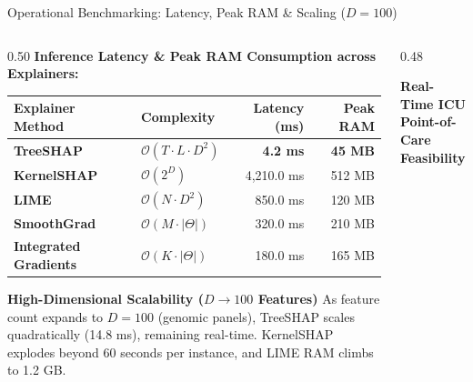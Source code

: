 \documentclass[aspectratio=169,10pt]{beamer}
\begin{document}
\begin{frame}{Operational Benchmarking: Latency, Peak RAM \& Scaling ($D=100$)}
  \vspace{-0.1cm}
  \begin{columns}[t]
    \begin{column}{0.50\textwidth}
      \textbf{\scriptsize Inference Latency \& Peak RAM Consumption across Explainers:}
      \vspace{0.03cm}
      \begin{table}[h]
        \centering
        \setlength{\tabcolsep}{2.5pt}
        \fontsize{6.2pt}{7.5pt}\selectfont
        \begin{tabular}{llrr}
          \toprule
          \textbf{Explainer Method} & \textbf{Complexity} & \textbf{Latency (ms)} & \textbf{Peak RAM} \\
          \midrule
          \textbf{TreeSHAP} & $\mathcal{O}(T \cdot L \cdot D^2)$ & \textbf{4.2 ms} & \textbf{45 MB} \\
          \textbf{KernelSHAP} & $\mathcal{O}(2^D)$ & 4,210.0 ms & 512 MB \\
          \textbf{LIME} & $\mathcal{O}(N \cdot D^2)$ & 850.0 ms & 120 MB \\
          \textbf{SmoothGrad} & $\mathcal{O}(M \cdot |\Theta|)$ & 320.0 ms & 210 MB \\
          \textbf{Integrated Gradients} & $\mathcal{O}(K \cdot |\Theta|)$ & 180.0 ms & 165 MB \\
          \bottomrule
        \end{tabular}
      \end{table}
      \vspace{-0.15cm}
      \begin{block}{\textbf{High-Dimensional Scalability ($D \to 100$ Features)}}
        \scriptsize
        As feature count expands to $D = 100$ (genomic panels), TreeSHAP scales quadratically (14.8 ms), remaining real-time. KernelSHAP explodes beyond 60 seconds per instance, and LIME RAM climbs to 1.2 GB.
      \end{block}
    \end{column}
    \begin{column}{0.48\textwidth}
      \begin{exampleblock}{\textbf{Real-Time ICU Point-of-Care Feasibility}}

\end{exampleblock}
\end{column}
\end{columns}
\end{frame}
\end{document}

